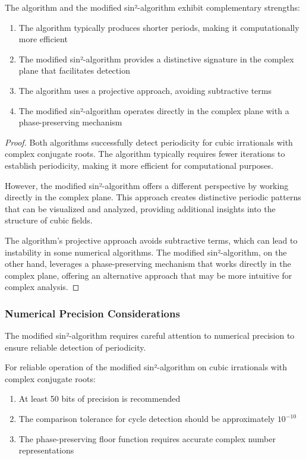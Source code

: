\begin{proposition}
The \HAPD{} algorithm and the modified sin²-algorithm exhibit complementary strengths:
\begin{enumerate}
    \item The \HAPD{} algorithm typically produces shorter periods, making it computationally more efficient
    \item The modified sin²-algorithm provides a distinctive signature in the complex plane that facilitates detection
    \item The \HAPD{} algorithm uses a projective approach, avoiding subtractive terms
    \item The modified sin²-algorithm operates directly in the complex plane with a phase-preserving mechanism
\end{enumerate}
\end{proposition}

\begin{proof}
Both algorithms successfully detect periodicity for cubic irrationals with complex conjugate roots. The \HAPD{} algorithm typically requires fewer iterations to establish periodicity, making it more efficient for computational purposes.

However, the modified sin²-algorithm offers a different perspective by working directly in the complex plane. This approach creates distinctive periodic patterns that can be visualized and analyzed, providing additional insights into the structure of cubic fields.

The \HAPD{} algorithm's projective approach avoids subtractive terms, which can lead to instability in some numerical algorithms. The modified sin²-algorithm, on the other hand, leverages a phase-preserving mechanism that works directly in the complex plane, offering an alternative approach that may be more intuitive for complex analysis.
\end{proof}

\subsubsection{Numerical Precision Considerations}

The modified sin²-algorithm requires careful attention to numerical precision to ensure reliable detection of periodicity.

\begin{proposition}
For reliable operation of the modified sin²-algorithm on cubic irrationals with complex conjugate roots:
\begin{enumerate}
    \item At least 50 bits of precision is recommended
    \item The comparison tolerance for cycle detection should be approximately $10^{-10}$
    \item The phase-preserving floor function requires accurate complex number representations
\end{enumerate}
\end{proposition}


